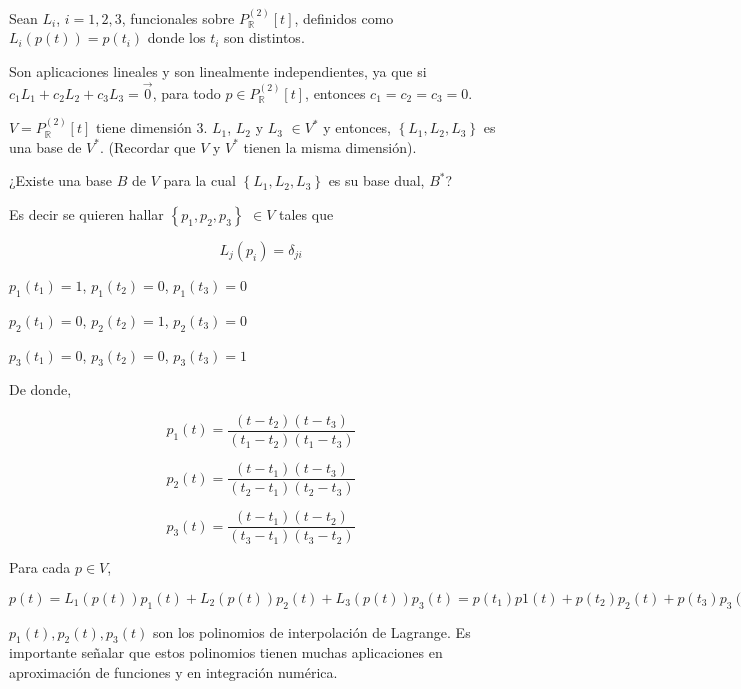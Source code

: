 \begin{example}
\label{polLag}

Sean $L_i$, $i=1,2,3$, funcionales  sobre $P_\mathbb{R}^{(2)}\left[t\right]$, definidos como  $L_i(p(t))=p(t_i)$  donde los $t_i$ son distintos. 

Son aplicaciones lineales y son linealmente independientes, ya que si $c_1 L_1 + c_2 L_2 + c_3 L_3=\vec{0}$, para todo $p \in P_\mathbb{R}^{(2)}\left[t\right]$, entonces $c_1=c_2=c_3=0$.


 

$V= P_\mathbb{R}^{(2)}\left[t\right]$ tiene dimensión $3$. $L_1$, $L_2$ y $L_3$ $\in V^*$ y entonces,
$\left\{L_1, L_2,  L_3 \right\}$ es una base de $V^*$. (Recordar que $V$ y $V^*$ tienen la misma dimensión).



¿Existe una base $B$  de $V$ para la cual $\left\{L_1, L_2,  L_3 \right\}$ es su base dual, $ B^*$?

Es decir se quieren hallar   $\left\{p_1,p_2, p_3 \right\}$ $\in V$  tales que 

$$L_j(p_i)=\delta_{ji}$$

\bigskip

$p_1(t_1)=1$, $p_1(t_2)=0$, $p_1(t_3)=0$

$p_2(t_1)=0$, $p_2(t_2)=1$, $p_2(t_3)=0$

$p_3(t_1)=0$, $p_3(t_2)=0$, $p_3(t_3)=1$

\bigskip

De donde, 




\[
p_1(t)= \frac{(t-t_2)(t-t_3)}{(t_1-t_2)(t_1-t_3)}
\]



\[p_2(t)= \frac{(t-t_1)(t-t_3)}{(t_2-t_1)(t_2-t_3)}\]



\[p_3(t)= \frac{(t-t_1)(t-t_2)}{(t_3-t_1)(t_3-t_2)}\]

\bigskip







Para cada $p \in V$, 
\bigskip

$p(t)=L_1(p(t))p_1(t) + L_2(p(t)) p_2(t) + L_3(p(t))p_3(t)= p(t_1)p1(t) + p(t_2) p_2(t) + p(t_3) p_3(t) $

\bigskip

$p_1(t),p_2(t), p_3(t)$ son los polinomios de interpolación de Lagrange. Es importante señalar que estos polinomios tienen muchas aplicaciones en aproximación de funciones y en integración numérica.


\end{example}
